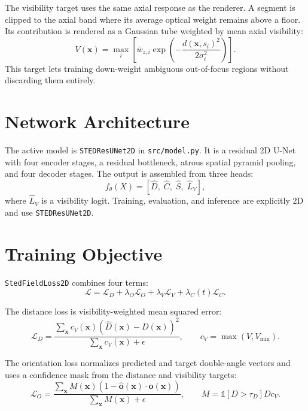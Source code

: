 \documentclass[11pt, a4paper]{article}
\begin{document}
The visibility target uses the same axial response as the renderer. A segment is
clipped to the axial band where its average optical weight remains above a floor.
Its contribution is rendered as a Gaussian tube weighted by mean axial visibility:
\begin{equation}
    V(\bm{x}) = \max_i
    \left[
    \bar{w}_{z,i}
    \exp\left(-\frac{d(\bm{x}, s_i)^2}{2\sigma_i^2}\right)
    \right].
\end{equation}
This target lets training down-weight ambiguous out-of-focus regions without
discarding them entirely.

\section{Network Architecture}

The active model is \texttt{STEDResUNet2D} in \texttt{src/model.py}. It is a
residual 2D U-Net with four encoder stages, a residual bottleneck, atrous spatial
pyramid pooling, and four decoder stages. The output is assembled from three
heads:
\begin{equation}
    f_{\theta}(X) =
    \left[\hat{D},\; \hat{C},\; \hat{S},\; \hat{L}_V\right],
\end{equation}
where $\hat{L}_V$ is a visibility logit. Training, evaluation, and inference are
explicitly 2D and use \texttt{STEDResUNet2D}.

\section{Training Objective}

\texttt{StedFieldLoss2D} combines four terms:
\begin{equation}
    \mathcal{L} =
    \mathcal{L}_{D}
    + \lambda_O \mathcal{L}_{O}
    + \lambda_V \mathcal{L}_{V}
    + \lambda_C(t) \mathcal{L}_{C}.
\end{equation}

The distance loss is visibility-weighted mean squared error:
\begin{equation}
    \mathcal{L}_{D} =
    \frac{\sum_{\bm{x}} c_V(\bm{x})
    \left(\hat{D}(\bm{x}) - D(\bm{x})\right)^2}
    {\sum_{\bm{x}} c_V(\bm{x}) + \epsilon},
    \qquad
    c_V = \max(V, V_{\min}).
\end{equation}

The orientation loss normalizes predicted and target double-angle vectors and
uses a confidence mask from the distance and visibility targets:
\begin{equation}
    \mathcal{L}_{O} =
    \frac{\sum_{\bm{x}} M(\bm{x})
    \left(1 - \hat{\bm{o}}(\bm{x}) \cdot \bm{o}(\bm{x})\right)}
    {\sum_{\bm{x}} M(\bm{x}) + \epsilon},
    \qquad
    M = \mathbb{1}[D > \tau_D] D c_V.
\end{equation}
\end{document}
